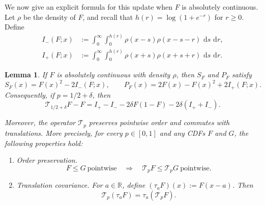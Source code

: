 \documentclass[12pt]{amsart}
\numberwithin{equation}{section}
\theoremstyle{plain}
\newtheorem{lemma}[theorem]{Lemma}
\theoremstyle{definition}
\newcommand{\dd}{\,\mathrm d}
\newcommand{\R}{\mathbb R}
\begin{document}
We now give an explicit formula for this update when $F$ is absolutely
continuous.  Let $\rho$ be the density of $F$, and recall that
$h(r)=\log(1+e^{-r})$ for $r\ge0$.
Define \[
\begin{aligned}
I_-(F;x)
 &:=\int_0^\infty\int_0^{h(r)}
   \rho(x-s)\rho(x-s-r)\,\dd s\,\dd r,
 \\
 I_+(F;x)
 &:=\int_0^\infty\int_0^{h(r)}
   \rho(x+s)\rho(x+s+r)\,\dd s\,\dd r.
\end{aligned} \]

\begin{lemma}
\label{lem:exact-cdf}
If $F$ is absolutely continuous with density $\rho$, then $S_F$ and $P_F$
satisfy
\begin{equation}
 S_F(x)=F(x)^2-2I_-(F;x),
 \qquad
 P_F(x)=2F(x)-F(x)^2+2I_+(F;x).
 \label{eq:series-parallel-cdf}
\end{equation}
Consequently, if $p=1/2+\delta$, then
\begin{equation}
 \mathcal T_{1/2+\delta}F-F
 =I_+-I_--2\delta F(1-F)-2\delta(I_++I_-).
 \label{eq:exact-cdf-operator}
\end{equation}
\begin{samepage}
Moreover, the operator $\mathcal T_p$ preserves pointwise order and commutes
with translations.  More precisely, for every $p\in[0,1]$ and any CDFs $F$
and $G$, the following properties hold:
\begin{enumerate}
\item[(i)] \emph{Order preservation.}
\[
 F\le G\ \text{pointwise}
 \quad\Longrightarrow\quad
 \mathcal T_pF\le\mathcal T_pG\ \text{pointwise}.
\]
\item[(ii)] \emph{Translation covariance.}  For $a\in\R$, define
$(\tau_aF)(x):=F(x-a)$.  Then
\[
 \mathcal T_p(\tau_aF)=\tau_a(\mathcal T_pF).
\]
\end{enumerate}
\end{samepage}
\end{lemma}
\end{document}
